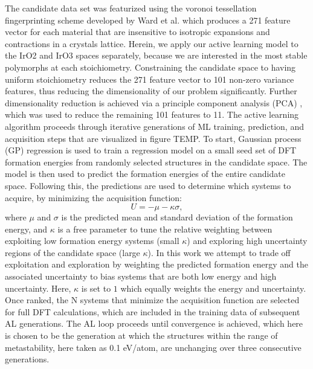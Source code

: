 The candidate data set was featurized using the voronoi tessellation fingerprinting scheme developed by Ward et al. \cite{Ward2017} which produces a 271 feature vector for each material that are insensitive to isotropic expansions and contractions in a crystals lattice.
Herein, we apply our active learning model to the IrO2 and IrO3 spaces separately, because we are interested in the most stable polymorphs at each stoichiometry. Constraining the candidate space to having uniform stoichiometry reduces the 271 feature vector to 101 non-zero variance features, thus reducing the dimensionality of our problem significantly.
Further dimensionality reduction is achieved via a principle component analysis (PCA) \cite{Tipping1999}, which was used to reduce the remaining 101 features to 11.
The active learning algorithm proceeds through iterative generations of ML training, prediction, and acquisition steps that are visualized in figure TEMP.
To start, Gaussian process (GP) regression is used to train a regression model on a small seed set of DFT formation energies from randomly selected structures in the candidate space.
%
The model is then used to predict the formation energies of the entire candidate space.
%
Following this, the predictions are used to determine which systems to acquire, by minimizing the acquisition function:
\begin{equation}
    U = - \mu - \kappa \sigma,
\end{equation}
%
where $\mu$ and $\sigma$ is the predicted mean and standard deviation of the formation energy, and
$\kappa$ is a free parameter to tune the relative weighting between exploiting low formation energy systems (small $\kappa$) and exploring high uncertainty regions of the candidate space (large $\kappa$).
%
In this work we attempt to trade off exploitation and exploration by weighting the predicted formation energy and the associated uncertainty to bias systems that are both low energy and high uncertainty.
%
Here, $\kappa$ is set to $1$ which equally weights the energy and uncertainty.
%
Once ranked, the N systems that minimize the acquisition function are selected for full DFT calculations, which are included in the training data of subsequent AL generations. The AL loop proceeds until convergence is achieved, which here is chosen to be the generation at which the structures within the range of metastability, here taken as 0.1 eV/atom, are unchanging over three consecutive generations.




